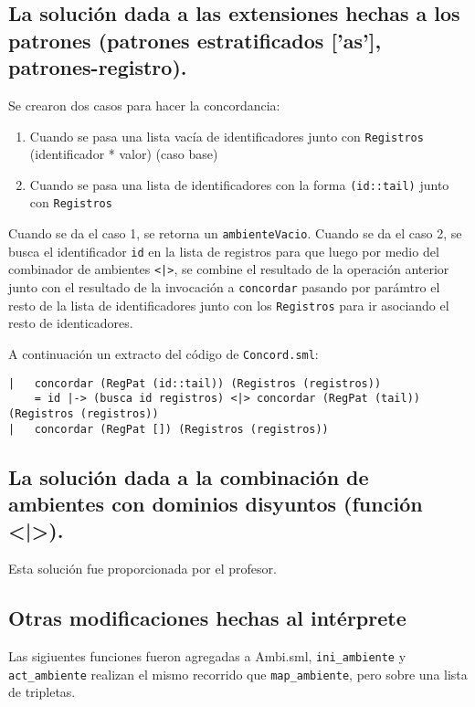 \documentclass[12pt, times]{simauth}
\begin{document}
\subsection{La solución dada a las extensiones hechas a los patrones (patrones estratificados ['as'], patrones-registro).}

Se crearon dos casos para hacer la concordancia:
\begin{enumerate}
    \item Cuando se pasa una lista vacía de identificadores junto con \texttt{Registros} (identificador * valor) (caso base)
    \item Cuando se pasa una lista de identificadores con la forma \texttt{(id::tail)} junto con \texttt{Registros}
\end{enumerate}

Cuando se da el caso 1, se retorna un \texttt{ambienteVacio}. Cuando se da el caso 2, se busca el identificador \texttt{id} en la lista de registros para que luego por medio del combinador de ambientes \texttt{<|>}, se combine el resultado de la operación anterior junto con el resultado de la invocación a \texttt{concordar} pasando por parámtro el resto de la lista de identificadores junto con los \texttt{Registros} para ir asociando el resto de identicadores.

A continuación un extracto del código de \texttt{Concord.sml}:

\begin{verbatim}
|   concordar (RegPat (id::tail)) (Registros (registros))
    = id |-> (busca id registros) <|> concordar (RegPat (tail)) (Registros (registros))
|   concordar (RegPat []) (Registros (registros))
\end{verbatim}

\subsection{La solución dada a la combinación de ambientes con dominios disyuntos (función <|>).}
Esta solución fue proporcionada por el profesor.

\subsection{Otras modificaciones hechas al intérprete}
Las sigiuentes funciones fueron agregadas a Ambi.sml, \texttt{ini\_ambiente} y \texttt{act\_ambiente} realizan el mismo recorrido que \texttt{map\_ambiente}, pero sobre una lista de tripletas.
\end{document}
